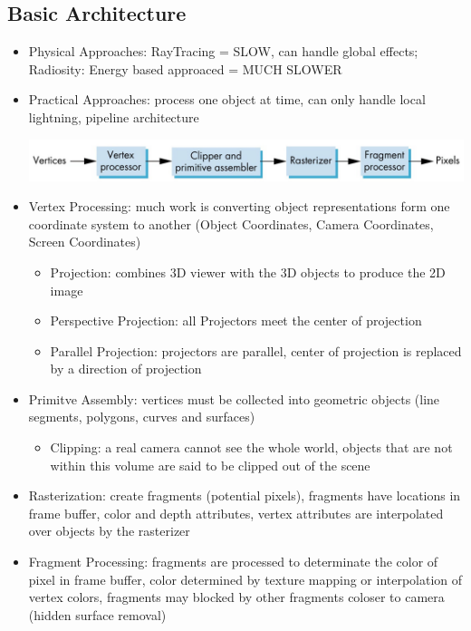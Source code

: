 \documentclass[11pt,a4paper]{article}
\begin{document}
	\subsection{Basic Architecture} 
		\begin{itemize}
			\item Physical Approaches: RayTracing = SLOW, can handle global effects; Radiosity: Energy based approaced = MUCH SLOWER
			\item Practical Approaches: process one object at time, can only handle local lightning, pipeline architecture
			\begin{center}
				\includegraphics[scale=0.5]{pictures/pic4.jpg}
			\end{center}
			\item Vertex Processing: much work is converting object representations form one coordinate system to another (Object Coordinates, Camera Coordinates, Screen Coordinates)
			\begin{itemize}
				\item Projection: combines 3D viewer with the 3D objects to produce the 2D image
				\item Perspective Projection: all Projectors meet the center of projection
				\item Parallel Projection: projectors are parallel, center of projection is replaced by a direction of projection
			\end{itemize}
			\item Primitve Assembly: vertices must be collected into geometric objects (line segments, polygons, curves and surfaces)
			\begin{itemize}
				\item Clipping: a real camera cannot see the whole world, objects that are not within this volume are said to be clipped out of the scene
			\end{itemize}
			\item Rasterization: create fragments (potential pixels), fragments have locations in frame buffer, color and depth attributes, vertex attributes are interpolated over objects by the rasterizer
			\item Fragment Processing: fragments are processed to determinate the color of pixel in frame buffer, color determined by texture mapping or interpolation of vertex colors, fragments may blocked by other fragments coloser to camera (hidden surface removal)

\end{itemize}
\end{document}
